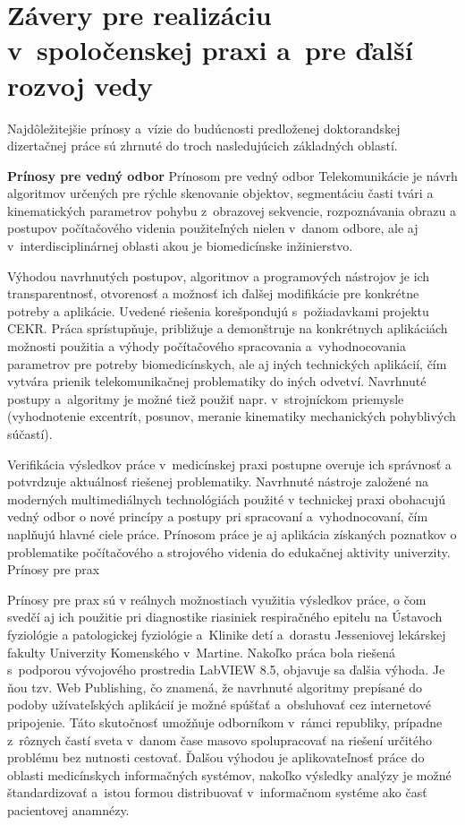 \chapter{Závery pre realizáciu v spoločenskej praxi a pre ďalší rozvoj vedy}

\pagestyle{fancy}
\fancyhf{}
\fancyfoot[CE,CO]{\thepage}



Najdôležitejšie prínosy a vízie do budúcnosti predloženej doktorandskej dizertačnej práce sú zhrnuté do troch nasledujúcich základných oblastí.

\textbf{Prínosy pre vedný odbor}
Prínosom pre vedný odbor Telekomunikácie je návrh algoritmov určených pre rýchle skenovanie objektov, segmentáciu časti tvári a   kinematických parametrov pohybu z obrazovej sekvencie, rozpoznávania obrazu a postupov počítačového videnia použiteľných nielen v danom odbore, ale aj v interdisciplinárnej oblasti akou je biomedicínske inžinierstvo. 

Výhodou navrhnutých postupov, algoritmov a programových nástrojov je ich transparentnosť, otvorenosť a možnosť ich ďalšej modifikácie pre konkrétne potreby a aplikácie. Uvedené riešenia korešpondujú s požiadavkami projektu CEKR. Práca sprístupňuje, približuje a demonštruje na konkrétnych aplikáciách možnosti použitia a výhody počítačového spracovania a vyhodnocovania parametrov pre potreby biomedicínskych, ale aj iných technických aplikácií, čím vytvára prienik telekomunikačnej problematiky do iných odvetví.  Navrhnuté postupy a algoritmy je možné tiež použiť napr. v strojníckom priemysle (vyhodnotenie excentrít, posunov, meranie kinematiky mechanických pohyblivých súčastí). 

Verifikácia výsledkov práce v medicínskej praxi postupne overuje ich správnosť a potvrdzuje aktuálnosť riešenej problematiky. Navrhnuté nástroje založené na moderných multimediálnych technológiách použité v technickej praxi obohacujú vedný odbor o nové princípy a postupy pri spracovaní a vyhodnocovaní, čím naplňujú hlavné ciele práce. Prínosom práce je aj aplikácia získaných poznatkov o problematike počítačového a strojového videnia do edukačnej aktivity univerzity. 
Prínosy pre prax

Prínosy pre prax sú v reálnych možnostiach využitia výsledkov práce, o čom svedčí aj ich použitie pri diagnostike riasiniek respiračného epitelu na Ústavoch fyziológie  a patologickej fyziológie a Klinike detí a dorastu Jesseniovej lekárskej fakulty Univerzity Komenského v Martine. Nakoľko práca bola riešená s podporou vývojového prostredia LabVIEW 8.5, objavuje sa ďalšia výhoda. Je ňou tzv. Web Publishing, čo znamená, že navrhnuté algoritmy prepísané do podoby užívateľských aplikácií je možné spúšťať a obsluhovať cez internetové pripojenie. Táto skutočnosť umožňuje odborníkom v rámci republiky, prípadne z rôznych častí sveta v danom čase masovo spolupracovať na riešení určitého problému bez nutnosti cestovať.
Ďalšou výhodou je aplikovateľnosť práce do oblasti medicínskych informačných systémov, nakoľko výsledky analýzy je možné štandardizovať a istou formou distribuovať v informačnom systéme ako časť pacientovej anamnézy.

